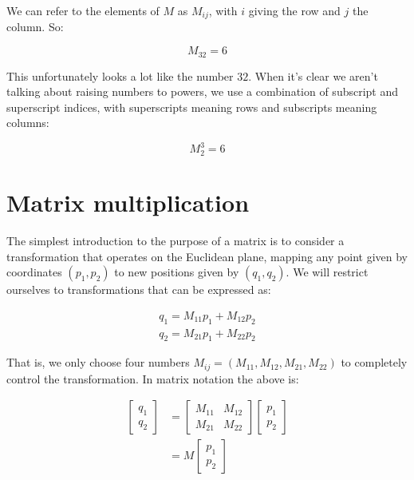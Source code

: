 We can refer to the elements of $M$ as $M_{ij}$, with $i$ giving the row and $j$ the column. So:

$$M_{32} = 6$$

This unfortunately looks a lot like the number $32$. When it's clear we aren't talking about raising numbers to powers, we use a combination of subscript and superscript indices, with superscripts meaning rows and subscripts meaning columns:

$$M^3_2 = 6$$

\section{Matrix multiplication} \label{sec:matrix-multiplication}

The simplest introduction to the purpose of a matrix is to consider a transformation that operates on the Euclidean plane, mapping any point given by coordinates $(p_1, p_2)$ to new positions given by $(q_1, q_2)$. We will restrict ourselves to transformations that can be expressed as:

\begin{equation}
\begin{split}
q_1 = M_{11}p_1 + M_{12}p_2 \\
q_2 = M_{21}p_1 + M_{22}p_2
\end{split}
\label{eqn:matrix-multiplication-raw}
\end{equation}

That is, we only choose four numbers $M_{ij} = (M_{11}, M_{12}, M_{21}, M_{22})$ to completely control the transformation. In matrix notation the above is:

\begin{equation}
\begin{split}
\begin{bmatrix}
q_1 \\
q_2
\end{bmatrix}
&=
\begin{bmatrix}
M_{11} & M_{12} \\
M_{21} & M_{22}
\end{bmatrix}
\begin{bmatrix}
p_1 \\
p_2
\end{bmatrix} \\
&=
M
\begin{bmatrix}
p_1 \\
p_2
\end{bmatrix}
\end{split}
\end{equation}

